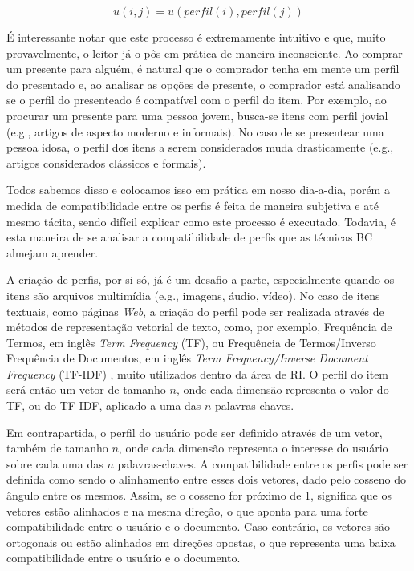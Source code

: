 \begin{equation}
u(i,j) = u(perfil(i),perfil(j))
\end{equation}

É interessante notar que este processo é extremamente intuitivo e que, muito provavelmente, o leitor já o pôs em prática de maneira inconsciente. Ao comprar um presente para alguém, é natural que o comprador tenha em mente um perfil do presentado e, ao analisar as opções de presente, o comprador está analisando se o perfil do presenteado é compatível com o perfil do item. Por exemplo, ao procurar um presente para uma pessoa jovem, busca-se itens com perfil jovial (e.g., artigos de aspecto moderno e informais). No caso de se presentear uma pessoa idosa, o perfil dos itens a serem considerados muda drasticamente (e.g., artigos considerados clássicos e formais). 

Todos sabemos disso e colocamos isso em prática em nosso dia-a-dia, porém a medida de compatibilidade entre os perfis é feita de maneira subjetiva e até mesmo tácita, sendo difícil explicar como este processo é executado. Todavia, é esta maneira de se analisar a compatibilidade de perfis que as técnicas BC almejam aprender.   

A criação de perfis, por si só, já é um desafio a parte, especialmente quando os itens são arquivos multimídia (e.g., imagens, áudio, vídeo). No caso de itens textuais, como páginas \textit{Web}, a criação do perfil pode ser realizada através de métodos de representação vetorial de texto, como, por exemplo, Frequência de Termos, em inglês \textit{Term Frequency} (TF), ou Frequência de Termos/Inverso Frequência de Documentos, em inglês \textit{Term Frequency/Inverse Document Frequency} (TF-IDF) \citep{Baeza-Yates:1999:MIR:553876}, muito utilizados dentro da área de RI. O perfil do item será então um vetor de tamanho $n$, onde cada dimensão representa o valor do TF, ou do TF-IDF, aplicado a uma das $n$ palavras-chaves.

Em contrapartida, o perfil do usuário pode ser definido através de um vetor, também de tamanho $n$, onde cada dimensão representa o interesse do usuário sobre cada uma das $n$ palavras-chaves. A compatibilidade entre os perfis pode ser definida como sendo o alinhamento entre esses dois vetores, dado pelo cosseno do ângulo entre os mesmos. Assim, se o cosseno for próximo de 1, significa que os vetores estão alinhados e na mesma direção, o que aponta para uma forte compatibilidade entre o usuário e o documento. Caso contrário, os vetores são ortogonais ou estão alinhados em direções opostas, o que representa uma baixa compatibilidade entre o usuário e o documento.

